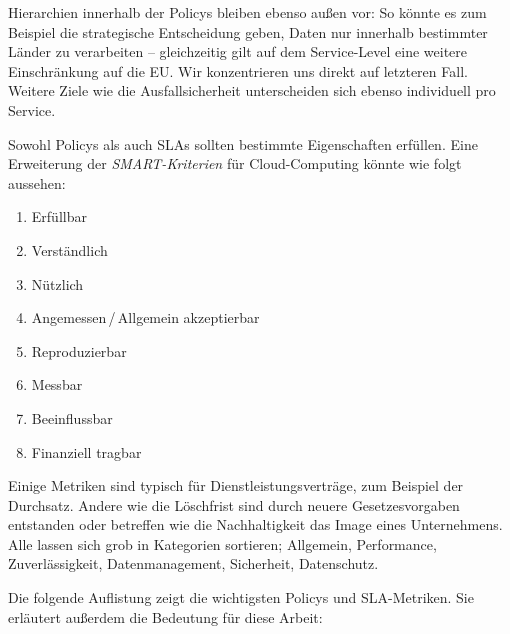 Hierarchien innerhalb der Policys bleiben ebenso außen vor: So könnte es zum Beispiel die strategische Entscheidung geben, Daten nur innerhalb bestimmter Länder zu verarbeiten -- gleichzeitig gilt auf dem Service-Level eine weitere Einschränkung auf die EU. Wir konzentrieren uns direkt auf letzteren Fall. Weitere Ziele wie die Ausfallsicherheit unterscheiden sich ebenso individuell pro Service.

Sowohl Policys als auch SLAs sollten bestimmte Eigenschaften erfüllen. Eine Erweiterung der \emph{SMART-Kriterien} für Cloud-Computing könnte wie folgt aussehen:
\begin{enumerate}
	\item Erfüllbar
	\item Verständlich
	\item Nützlich
	\item Angemessen\,/\,Allgemein akzeptierbar
	\item Reproduzierbar
	\item Messbar
	\item Beeinflussbar
	\item Finanziell tragbar
\end{enumerate}

\noindent 
Einige Metriken sind typisch für Dienstleistungsverträge, zum Beispiel der Durchsatz. Andere wie die Löschfrist sind durch neuere Gesetzesvorgaben entstanden oder betreffen wie die Nachhaltigkeit das Image eines Unternehmens. Alle lassen sich grob in Kategorien sortieren; Allgemein, Performance, Zuverlässigkeit, Datenmanagement, Sicherheit, Datenschutz.

Die folgende Auflistung zeigt die wichtigsten Policys und SLA-Metriken. Sie erläutert außerdem die Bedeutung für diese Arbeit:

